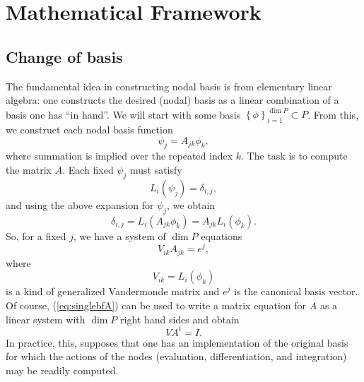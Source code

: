 \section{Mathematical Framework}
\subsection{Change of basis}


The fundamental idea in constructing nodal basis is from elementary
linear algebra: one constructs the desired (nodal) basis as a linear
combination of a basis one has ``in hand''.  We will start with some
basis \( \left\{ \phi \right\}_{i=1}^{\dim P} \subset P \).  From
this, we construct each nodal basis function 
\begin{equation}
 \psi_j = A_{jk} \phi_k,
\end{equation}
where summation is implied over the repeated index \( k \).  The
task is to compute the matrix \( A \).  Each fixed \( \psi_j \) must
satisfy
\begin{equation}
L_i( \psi_j ) = \delta_{i,j},
\end{equation}
and using the above expansion for \( \psi_j \), we obtain
\begin{equation}
\delta_{i,j} = L_i( A_{jk} \phi_{k} ) = A_{jk} L_i (\phi_k).
\end{equation}
So, for a fixed \( j \), we have a system of \( \dim P \) equations
\begin{equation}
\label{eq:singlebfA}
V_{ik} A_{jk} = e^j,
\end{equation}
where
\begin{equation}
V_{ik} = L_i(\phi_k)
\end{equation}
is a kind of generalized Vandermonde matrix and \( e^j \) is the
canonical basis vector.  Of course, (\ref{eq:singlebfA}) can be used
to write a matrix equation for \( A \) as a linear system with \( \dim
P \) right hand sides and obtain
\begin{equation}
V A^t = I.
\end{equation}
In practice, this, supposes that one has an implementation of
the original basis for which the actions of the nodes (evaluation,
differentiation, and integration) may be readily computed.


